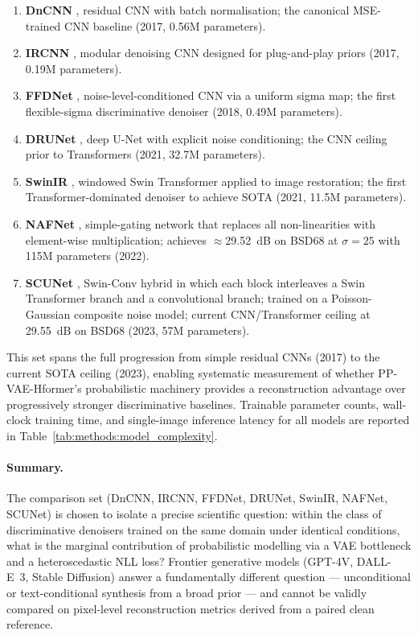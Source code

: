\documentclass[12pt, a4paper, twoside, openright]{book}
\begin{document}
\begin{enumerate}
  \item \textbf{DnCNN} \cite{zhang_beyond_2017}, residual CNN with batch normalisation; the canonical MSE-trained CNN baseline (2017, 0.56M parameters).
  \item \textbf{IRCNN} \cite{zhang_learning_2017}, modular denoising CNN designed for plug-and-play priors (2017, 0.19M parameters).
  \item \textbf{FFDNet} \cite{zhang_ffdnet_2018}, noise-level-conditioned CNN via a uniform sigma map; the first flexible-sigma discriminative denoiser (2018, 0.49M parameters).
  \item \textbf{DRUNet} \cite{zhang_drunet_2021}, deep U-Net with explicit noise conditioning; the CNN ceiling prior to Transformers (2021, 32.7M parameters).
  \item \textbf{SwinIR} \cite{liang_swinir_2021}, windowed Swin Transformer applied to image restoration; the first Transformer-dominated denoiser to achieve SOTA (2021, 11.5M parameters).
  \item \textbf{NAFNet} \cite{chen_nafnet_2022}, simple-gating network that replaces all non-linearities with element-wise multiplication; achieves $\approx$29.52~dB on BSD68 at $\sigma=25$ with 115M parameters (2022).
  \item \textbf{SCUNet} \cite{zhang_scunet_2023}, Swin-Conv hybrid in which each block interleaves a Swin Transformer branch and a convolutional branch; trained on a Poisson-Gaussian composite noise model; current CNN/Transformer ceiling at 29.55~dB on BSD68 (2023, 57M parameters).
\end{enumerate}

This set spans the full progression from simple residual CNNs (2017) to the current SOTA ceiling (2023), enabling systematic measurement of whether PP-VAE-Hformer's probabilistic machinery provides a reconstruction advantage over progressively stronger discriminative baselines. Trainable parameter counts, wall-clock training time, and single-image inference latency for all models are reported in Table~\ref{tab:methods:model_complexity}.

\paragraph{Summary.}
The comparison set (DnCNN, IRCNN, FFDNet, DRUNet, SwinIR, NAFNet, SCUNet) is chosen to isolate a precise scientific question: within the class of discriminative denoisers trained on the same domain under identical conditions, what is the marginal contribution of probabilistic modelling via a VAE bottleneck and a heteroscedastic NLL loss? Frontier generative models (GPT-4V, DALL-E~3, Stable Diffusion) answer a fundamentally different question --- unconditional or text-conditional synthesis from a broad prior --- and cannot be validly compared on pixel-level reconstruction metrics derived from a paired clean reference.
\end{document}
